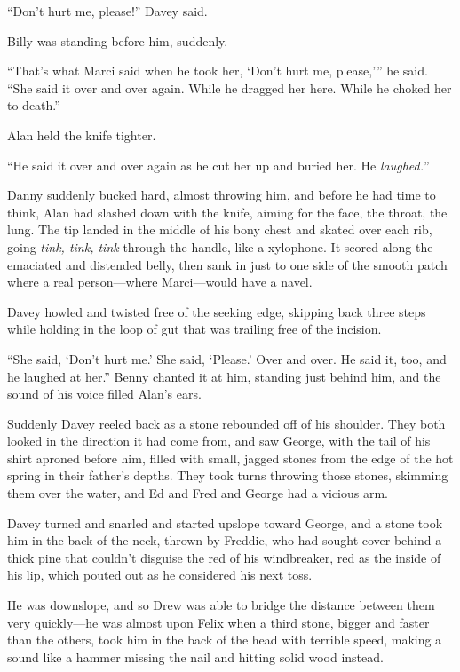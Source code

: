 ``Don't hurt me, please!'' Davey said.

Billy was standing before him, suddenly.

``That's what Marci said when he took her, `Don't hurt me, please,'''
he said.  ``She said it over and over again.  While he dragged her
here.  While he choked her to death.''

Alan held the knife tighter.

``He said it over and over again as he cut her up and buried her.  He
\textit{laughed.}''

Danny suddenly bucked hard, almost throwing him, and before he had
time to think, Alan had slashed down with the knife, aiming for the
face, the throat, the lung.  The tip landed in the middle of his bony
chest and skated over each rib, going \textit{tink, tink, tink}
through the handle, like a xylophone.  It scored along the emaciated
and distended belly, then sank in just to one side of the smooth patch
where a real person---where Marci---would have a navel.

Davey howled and twisted free of the seeking edge, skipping back three
steps while holding in the loop of gut that was trailing free of the
incision.

``She said, `Don't hurt me.' She said, `Please.' Over and over.  He
said it, too, and he laughed at her.'' Benny chanted it at him,
standing just behind him, and the sound of his voice filled Alan's
ears.

Suddenly Davey reeled back as a stone rebounded off of his shoulder. 
They both looked in the direction it had come from, and saw George,
with the tail of his shirt aproned before him, filled with small,
jagged stones from the edge of the hot spring in their father's
depths.  They took turns throwing those stones, skimming them over the
water, and Ed and Fred and George had a vicious arm.

Davey turned and snarled and started upslope toward George, and a
stone took him in the back of the neck, thrown by Freddie, who had
sought cover behind a thick pine that couldn't disguise the red of his
windbreaker, red as the inside of his lip, which pouted out as he
considered his next toss.

He was downslope, and so Drew was able to bridge the distance between
them very quickly---he was almost upon Felix when a third stone,
bigger and faster than the others, took him in the back of the head
with terrible speed, making a sound like a hammer missing the nail and
hitting solid wood instead.

